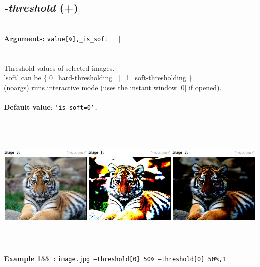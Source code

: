 \documentclass[a4paper,11pt,twoside]{book}
\begin{document}
\subsection{\emph{-threshold} (+)}\vspace*{-0.5em}
~\\\textbf{Arguments: } 
{\small \texttt{value[\%],\_is\_soft}}~~~$|$\\
\\~\\
Threshold values of selected images.
~\\'soft' can be \{ 0=hard-thresholding ~$|$~ 1=soft-thresholding \}.
~\\(noargs) runs interactive mode (uses the instant window [0] if opened).
~\\~\\\textbf{Default value}: {\small \texttt{'is\_soft=0'.}}
\begin{center}\includegraphics[keepaspectratio=true,height=7cm,width=\textwidth]{img/gmic_def155.jpg}\\
{\footnotesize \textbf{Example 155~:} \texttt{image.jpg --threshold[0] 50\% --threshold[0] 50\%,1}}
\end{center}
\end{document}
